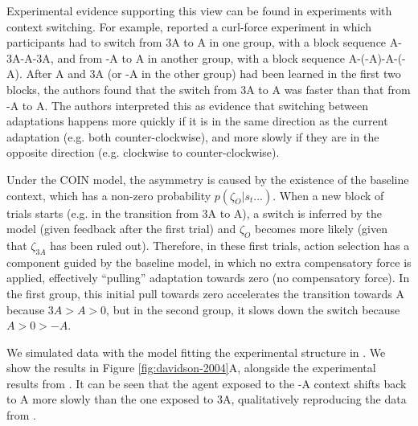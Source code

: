 \documentclass[a4paper,doc,floatsintext,natbib]{apa6}
\def \fref #1{Figure \ref{#1}}     %
\begin{document}
Experimental evidence supporting this view can be found in experiments with context switching. For example, \cite{Davidson_Scaling_2004} reported a curl-force experiment in which participants had to switch from 3A to A in one group, with a block sequence A-3A-A-3A, and from -A to A in another group, with a block sequence A-(-A)-A-(-A). After A and 3A (or -A in the other group) had been learned in the first two blocks, the authors found that the switch from 3A to A was faster than that from -A to A. The authors interpreted this as evidence that switching between adaptations happens more quickly if it is in the same direction as the current adaptation (e.g. both counter-clockwise), and more slowly if they are in the opposite direction (e.g. clockwise to counter-clockwise).

Under the COIN model, the asymmetry is caused by the existence of the baseline context, which has a non-zero probability $p(\zeta_O | s_t ...)$. When a new block of trials starts (e.g. in the transition from 3A to A), a switch is inferred by the model (given feedback after the first trial) and $\zeta_O$ becomes more likely (given that $\zeta_{3A}$ has been ruled out). Therefore, in these first trials, action selection has a component guided by the baseline model, in which no extra compensatory force is applied, effectively ``pulling'' adaptation towards zero (no compensatory force). In the first group, this initial pull towards zero accelerates the transition towards A because $3A > A > 0$, but in the second group, it slows down the switch because $A > 0 > -A$.

We simulated data with the model fitting the experimental structure in \cite{Davidson_Scaling_2004}. We show the results in \fref{fig:davidson-2004}A, alongside the experimental results from \cite{Davidson_Scaling_2004}. It can be seen that the agent exposed to the -A context shifts back to A more slowly than the one exposed to 3A, qualitatively reproducing the data from \cite{Davidson_Scaling_2004}.
\end{document}
